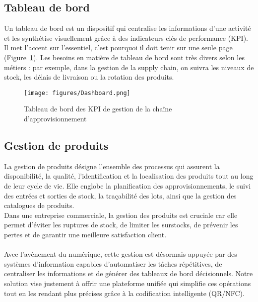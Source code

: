 \documentclass[12pt,a4paper]{report}
\begin{document}

\subsection{Tableau de bord}
Un tableau de bord est un dispositif qui centralise les informations d’une activité et les synthétise visuellement grâce à des indicateurs clés de performance (KPI). Il met l’accent sur l’essentiel, c’est pourquoi il doit tenir sur une seule page (Figure~\ref{fig:dashboard_supply}). Les besoins en matière de tableau de bord sont très divers selon les métiers : par exemple, dans la gestion de la supply chain, on suivra les niveaux de stock, les délais de livraison ou la rotation des produits.  
\begin{figure}[H]
  \centering
  \texttt{[image: figures/Dashboard.png]}
  \caption{Tableau de bord des KPI de gestion de la chaîne d’approvisionnement}
  \label{fig:dashboard_supply}
\end{figure}


\subsection{Gestion de produits}
La gestion de produits désigne l’ensemble des processus qui assurent la disponibilité, la qualité, l’identification et la localisation des produits tout au long de leur cycle de vie. Elle englobe la planification des approvisionnements, le suivi des entrées et sorties de stock, la traçabilité des lots, ainsi que la gestion des catalogues de produits.\\ 
Dans une entreprise commerciale, la gestion des produits est cruciale car elle permet d’éviter les ruptures de stock, de limiter les surstocks, de prévenir les pertes et de garantir une meilleure satisfaction client. \\ 
\\Avec l’avènement du numérique, cette gestion est désormais appuyée par des systèmes d’information capables d’automatiser les tâches répétitives, de centraliser les informations et de générer des tableaux de bord décisionnels. Notre solution vise justement à offrir une plateforme unifiée qui simplifie ces opérations tout en les rendant plus précises grâce à la codification intelligente (QR/NFC).

\end{document}
